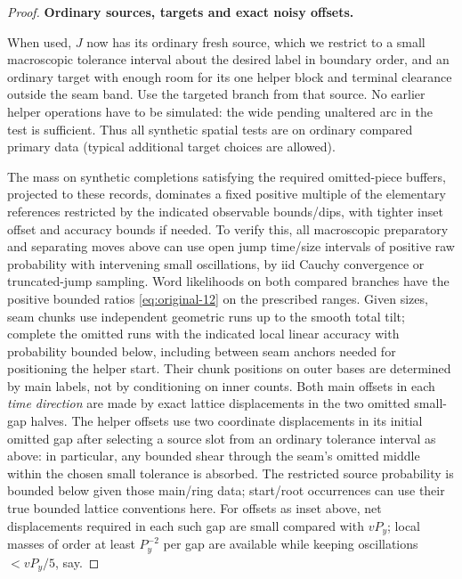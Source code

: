 \begin{proof}
\smallskip
\noindent\textbf{Ordinary sources, targets and exact noisy offsets.}\quad

When used, \(J\) now has its ordinary fresh source, which we restrict to a small
macroscopic tolerance interval about the desired label in boundary order, and an ordinary
target with enough room for its one helper block and terminal clearance outside the seam
band. Use the targeted branch from that source. No earlier helper operations have to be
simulated: the wide pending unaltered arc in the test is sufficient. Thus all synthetic
spatial tests are on ordinary compared primary data (typical additional target choices are
allowed).

The mass on synthetic completions satisfying the required omitted-piece buffers, projected
to these records, dominates a fixed positive multiple of the elementary references
restricted by the indicated observable bounds/dips, with tighter inset offset and accuracy
bounds if needed. To verify this, all macroscopic preparatory and separating moves above
can use open jump time/size intervals of positive raw probability with intervening small
oscillations, by iid Cauchy convergence or truncated-jump sampling. Word likelihoods on
both compared branches have the positive bounded ratios \eqref{eq:original-12} on the
prescribed ranges. Given sizes, seam chunks use independent geometric runs up to the
smooth total tilt; complete the omitted runs with the indicated local linear accuracy with
probability bounded below, including between seam anchors needed for positioning the
helper start. Their chunk positions on outer bases are determined by main labels, not by
conditioning on inner counts. Both main offsets in each \emph{time direction} are made by
exact lattice displacements in the two omitted small-gap halves. The helper offsets use
two coordinate displacements in its initial omitted gap after selecting a source slot from
an ordinary tolerance interval as above: in particular, any bounded shear through the
seam's omitted middle within the chosen small tolerance is absorbed. The restricted source
probability is bounded below given those main/ring data; start/root occurrences can use
their true bounded lattice conventions here. For offsets as inset above, net displacements
required in each such gap are small compared with \(vP_y\); local masses of order at least
\(P_y^{-2}\) per gap are available while keeping oscillations \(<vP_y/5\), say. 


\end{proof}

